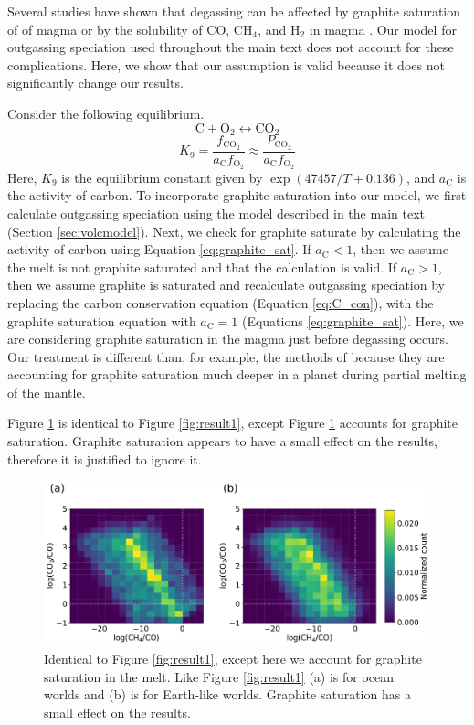 Several studies have shown that degassing can be affected by graphite saturation of of magma \citep{Hirschmann_2008} or by the solubility of CO, CH$_4$, and H$_2$ in magma \citep{Wetzel_2013,Ardia_2013,Hirschmann_2012}. Our model for outgassing speciation used throughout the main text does not account for these complications. Here, we show that our assumption is valid because it does not significantly change our results.

Consider the following equilibrium.
\begin{equation}
    \mathrm{C}+\mathrm{O_2}\leftrightarrow\mathrm{CO_2}
\end{equation}
\begin{equation} \label{eq:graphite_sat}
    K_9=\frac{f_\mathrm{CO_2}}{a_\mathrm{C}f_\mathrm{O_2}}\approx \frac{P_\mathrm{CO_2}}{a_\mathrm{C}f_\mathrm{O_2}}
\end{equation}
Here, $K_9$ is the equilibrium constant given by $\exp(47457/T+0.136)$, and $a_\mathrm{C}$ is the activity of carbon. To incorporate graphite saturation into our model, we first calculate outgassing speciation using the model described in the main text (Section \ref{sec:volcmodel}). Next, we check for graphite saturate by calculating the activity of carbon using Equation \eqref{eq:graphite_sat}. If $a_\mathrm{C}<1$, then we assume the melt is not graphite saturated and that the calculation is valid. If $a_\mathrm{C}>1$, then we assume graphite is saturated and recalculate outgassing speciation by replacing the carbon conservation equation (Equation \eqref{eq:C_con}), with the graphite saturation equation  with $a_\mathrm{C}=1$ (Equations \eqref{eq:graphite_sat}). Here, we are considering graphite saturation in the magma just before degassing occurs. Our treatment is different than, for example, the methods of \citet{Ortenzi_2020} because they are accounting for graphite saturation much deeper in a planet during partial melting of the mantle.

Figure \ref{fig:graphite} is identical to Figure \ref{fig:result1}, except Figure \ref{fig:graphite} accounts for graphite saturation. Graphite saturation appears to have a small effect on the results, therefore it is justified to ignore it.

\begin{figure}
    \centering
    \includegraphics[width=\textwidth]{tex/3methane/figures/both_Csat.pdf}
    \caption{Identical to Figure \ref{fig:result1}, except here we account for graphite saturation in the melt. Like Figure \ref{fig:result1} (a) is for ocean worlds and (b) is for Earth-like worlds. Graphite saturation has a small effect on the results.}
    \label{fig:graphite}
\end{figure}

